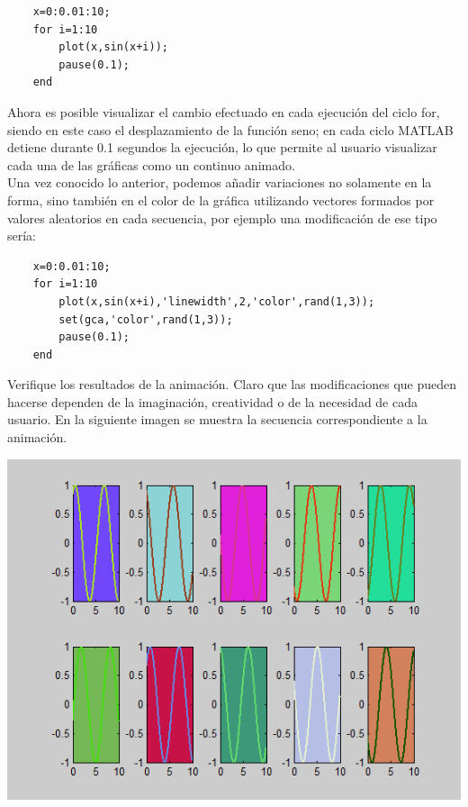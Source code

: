 \begin{verbatim}
	x=0:0.01:10;
	for i=1:10
	    plot(x,sin(x+i));
	    pause(0.1);
	end
\end{verbatim}

Ahora es posible visualizar el cambio efectuado en cada ejecución del ciclo for, siendo en 
este caso el desplazamiento de la función seno; en cada  ciclo MATLAB detiene durante 0.1 
segundos la ejecución, lo que permite al usuario visualizar cada una de las gráficas como 
un continuo animado.\\

Una vez conocido lo anterior, podemos añadir variaciones no solamente en la forma, sino 
también en el color de la gráfica utilizando vectores formados por valores aleatorios en 
cada secuencia, por ejemplo una modificación de ese tipo sería:

\begin{verbatim}
	x=0:0.01:10;
	for i=1:10
	    plot(x,sin(x+i),'linewidth',2,'color',rand(1,3));
	    set(gca,'color',rand(1,3));
	    pause(0.1);
	end
\end{verbatim}

Verifique los resultados de la animación. Claro que las modificaciones que pueden hacerse 
dependen de la imaginación, creatividad o de la necesidad de cada usuario. En la siguiente 
imagen se muestra la secuencia correspondiente a la animación.

\begin{center}
\includegraphics[scale=0.6]{src/ch4/img_4_12.png}
\end{center}